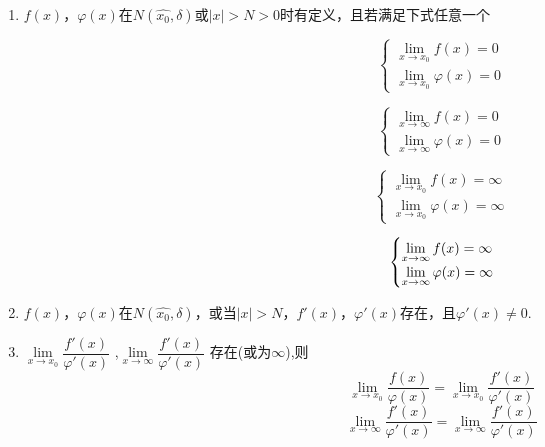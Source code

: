 \documentclass[UTF8]{ctexart}
\begin{document}
\\\begin{enumerate}[(1)]
\vspace{-4mm} \item $f(x)$，$\varphi(x)$在$N(\hat{x_0},\delta)$或$|x|>N>0$时有定义，且若满足下式任意一个

\vspace{-6mm}

\[
\begin{cases}
\lim\limits_{x \to x_0} f(x)= 0\\
\lim\limits_{x \to x_0} \varphi(x) = 0
\end{cases}
\]


\vspace{-20mm}
\[\hspace{1in}
\begin{cases}
\lim\limits_{x \to \infty} f(x)= 0\\
 \lim\limits_{x \to \infty} \varphi(x) = 0
\end{cases}
\hspace{1in}\]

 \vspace{-20mm}
\[\hspace{2in}
\begin{cases}
\lim\limits_{x \to x_0} f(x)= \infty\\
 \lim\limits_{x \to x_0} \varphi(x) = \infty
\end{cases}
\hspace{2in}\]

\vspace{-21mm}
\[\hspace{3.6in}
\begin{cases}
\lim\limits_{x \to \infty} f(x)= \infty\\
 \lim\limits_{x \to \infty} \varphi(x) = \infty
\end{cases}
\hspace{3.6in}\]

\vspace{5mm}\item $f(x)$，$\varphi(x)$在$N(\hat{x_0},\delta)$，或当$|x|>N$，$f'(x)$，$\varphi'(x)$存在，且$\varphi'(x)\neq0$.
\item $\lim\limits_{x \to x_0} \dfrac {f'(x)}{\varphi'(x)}$ ,$\lim\limits_{x \to \infty} \dfrac {f'(x)}{\varphi'(x)}$ 存在(或为$\infty$),则
$$\lim\limits_{x \to x_0} \frac {f(x)}{\varphi(x)}=\lim\limits_{x \to x_0} \frac {f'(x)}{\varphi'(x)}$$
$$\lim\limits_{x \to \infty} \frac {f'(x)}{\varphi'(x)}=\lim\limits_{x \to \infty} \frac {f'(x)}{\varphi'(x)}$$
\end{enumerate}
\end{document}
